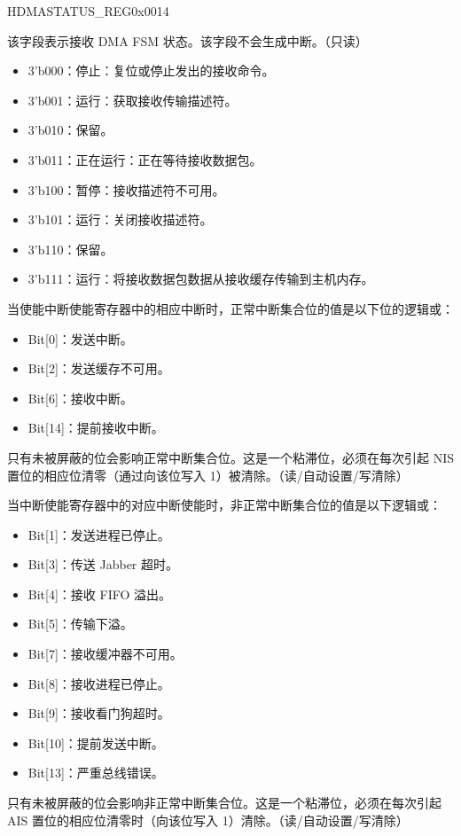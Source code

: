 \addtocounter{Regfloat}{-1}
\begin{register}{H}{DMASTATUS\_REG}{0x0014}
\begin{regdesc}\begin{reglist}
\item [继上一页寄存器描述。]

\item [RECV\_PROC\_STATE] 该字段表示接收 DMA FSM 状态。该字段不会生成中断。（只读）
\begin{itemize}
\item 3'b000：停止：复位或停止发出的接收命令。 \item 3'b001：运行：获取接收传输描述符。\item 3'b010：保留。 \item 3'b011：正在运行：正在等待接收数据包。 \item 3'b100：暂停：接收描述符不可用。\item 3'b101：运行：关闭接收描述符。\item 3'b110：保留。 \item 3'b111：运行：将接收数据包数据从接收缓存传输到主机内存。\end{itemize}

\item [NORM\_INT\_SUMM] 当使能中断使能寄存器中的相应中断时，正常中断集合位的值是以下位的逻辑或：

\begin{itemize}
\item Bit[0]：发送中断。\item Bit[2]：发送缓存不可用。\item Bit[6]：接收中断。\item  Bit[14]：提前接收中断。\end{itemize}只有未被屏蔽的位会影响正常中断集合位。这是一个粘滞位，必须在每次引起 NIS 置位的相应位清零（通过向该位写入 1）被清除。（读/自动设置/写清除）

\item [ABN\_INT\_SUMM] 当中断使能寄存器中的对应中断使能时，非正常中断集合位的值是以下逻辑或：

\begin{itemize}
\item Bit[1]：发送进程已停止。 \item Bit[3]：传送 Jabber 超时。 \item Bit[4]：接收 FIFO 溢出。 \item Bit[5]：传输下溢。 \item Bit[7]：接收缓冲器不可用。 \item Bit[8]：接收进程已停止。 \item Bit[9]：接收看门狗超时。 \item Bit[10]：提前发送中断。 \item Bit[13]：严重总线错误。\end{itemize}只有未被屏蔽的位会影响非正常中断集合位。这是一个粘滞位，必须在每次引起 AIS 置位的相应位清零时（向该位写入 1）清除。（读/自动设置/写清除）

\item [寄存器描述下一页继续。]
\end{reglist}\end{regdesc}
\end{register}

